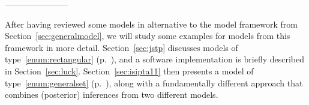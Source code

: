 -----------------------

\medskip

After having reviewed some models in alternative to the model framework from Section~\ref{sec:generalmodel},
we will study some examples for models from this framework in more detail.
Section~\ref{sec:jstp} discusses models of type~\ref{enum:rectangular} (p.~\pageref{enum:rectangular}),
and a software implementation is briefly described in Section~\ref{sec:luck}.
Section~\ref{sec:isipta11} then presents a model of type~\ref{enum:generalset} (p.~\pageref{enum:generalset}),
along with a fundamentally different approach that combines (posterior) inferences from two different models.

